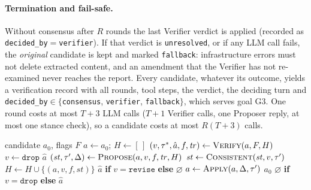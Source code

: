 \paragraph{Termination and fail-safe.}
Without consensus after $R$ rounds the last Verifier verdict is applied (recorded as \texttt{decided\_by}$=$\texttt{verifier}).
If that verdict is \texttt{unresolved}, or if any LLM call fails, the \emph{original} candidate is kept and marked \texttt{fallback}: infrastructure errors must not delete extracted content, and an amendment that the Verifier has not re-examined never reaches the report.
Every candidate, whatever its outcome, yields a verification record with all rounds, tool steps, the verdict, the deciding turn and \texttt{decided\_by}$\in\{$\texttt{consensus}, \texttt{verifier}, \texttt{fallback}$\}$, which serves goal G3.
One round costs at most $T{+}3$ LLM calls ($T{+}1$ Verifier calls, one Proposer reply, at most one stance check), so a candidate costs at most $R(T{+}3)$ calls.

\begin{algorithm}[t]
\caption{Verification of one UNCERTAIN candidate. \textsc{Verify} is one ReAct round ($\le T$ tool calls, then a final verdict $v$ with deciding turn $\tau^\ast$, revised item $\hat a$, feedback $f$ and tool trace $\mathit{tr}$); \textsc{Propose} is the extractor's reply. Any LLM error returns $a_0$ (fallback).}
\label{alg:consensus}
\small
\begin{algorithmic}[1]
\Require candidate $a_0$, flags $F$
\State $a \gets a_0$;\; $H \gets [\,]$ 
  \State $(v, \tau^\ast, \hat a, f, \mathit{tr}) \gets \Call{Verify}{a, F, H}$
    \State $v \gets \texttt{drop}$ 
  \EndIf
   \Return $\hat a$ \EndIf
  \State $(\mathit{st}, \tau', \Delta) \gets \Call{Propose}{a, v, f, \mathit{tr}, H}$
  \State $\mathit{st} \gets \Call{Consistent}{\mathit{st}, v, \tau'}$
  \State $H \gets H \cup \{(a, v, f, \mathit{st})\}$
    \State \Return $\hat a$ \textbf{if} $v = \texttt{revise}$ \textbf{else} $\varnothing$
  \EndIf
  \State $a \gets \Call{Apply}{a, \Delta, \tau'}$ 
\EndFor
{} \Return $a_0$  \EndIf
\State \Return $\varnothing$ \textbf{if} $v = \texttt{drop}$ \textbf{else} $\hat a$
\end{algorithmic}
\end{algorithm}

